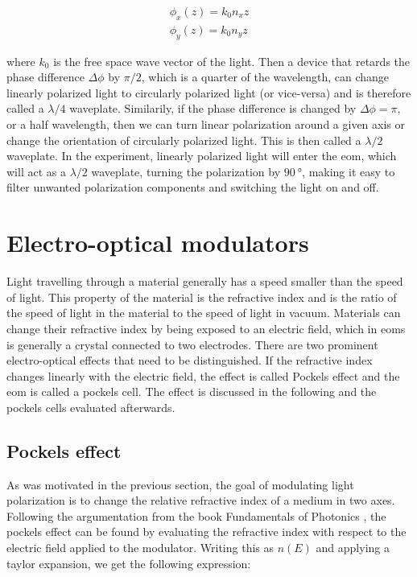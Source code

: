 \begin{align}
	\label{eq:pol,phases}
	\phi_x(z) = k_0 n_x z \\
	\phi_y(z) = k_0 n_y z
\end{align}

where $k_0$ is the free space wave vector of the light. Then a device that retards the phase difference $\Delta \phi$ by $\pi/2$, which is a quarter of the wavelength, can change linearly polarized light to circularly polarized light (or vice-versa) and is therefore called a $\lambda / 4$ waveplate. Similarily, if the phase difference is changed by $\Delta \phi = \pi$, or a half wavelength, then we can turn linear polarization around a given axis or change the orientation of circularly polarized light. This is then called a $\lambda / 2$ waveplate. In the experiment, linearly polarized light will enter the \ac{eom}, which will act as a $\lambda / 2$ waveplate, turning the polarization by $\SI{90}{\degree}$, making it easy to filter unwanted polarization components and switching the light on and off.

\section{Electro-optical modulators}
\label{sec:eom}

Light travelling through a material generally has a speed smaller than the speed of light. This property of the material is the refractive index and is the ratio of the speed of light in the material to the speed of light in vacuum. Materials can change their refractive index by being exposed to an electric field, which in \acp{eom} is generally a crystal connected to two electrodes. There are two prominent electro-optical effects that need to be distinguished. If the refractive index changes linearly with the electric field, the effect is called Pockels effect and the \ac{eom} is called a pockels cell. The effect is discussed in the following and the pockels cells evaluated afterwards.

\subsection{Pockels effect}
\label{sec:pockels_effect}

As was motivated in the previous section, the goal of modulating light polarization is to change the relative refractive index of a medium in two axes. Following the argumentation from the book Fundamentals of Photonics \cite{Saleh1991}, the pockels effect can be found by evaluating the refractive index with respect to the electric field applied to the modulator. Writing this as $n(E)$ and applying a taylor expansion, we get the following expression:


